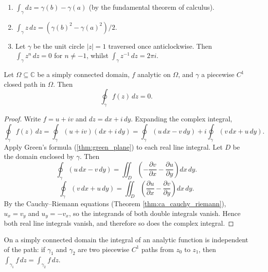 \begin{example}\label{ex:ca_basic_integrals}
\begin{enumerate}[label=(\roman*)]
    \item $\int_\gamma dz = \gamma(b) - \gamma(a)$ (by the fundamental theorem of calculus).
    \item $\int_\gamma z \, dz = (\gamma(b)^2 - \gamma(a)^2)/2$.
    \item Let $\gamma$ be the unit circle $|z| = 1$ traversed once anticlockwise. Then $\int_\gamma z^n \, dz = 0$ for $n \neq -1$, whilst $\int_\gamma z^{-1} \, dz = 2\pi i$.
\end{enumerate}
\end{example}

\begin{theorem}\label{thm:ca_cauchy_integral}
Let $\Omega \subseteq \mathbb{C}$ be a simply connected domain, $f$ analytic on $\Omega$, and $\gamma$ a piecewise $C^1$ closed path in $\Omega$. Then
\[
\oint_\gamma f(z) \, dz = 0.
\]
\end{theorem}

\begin{proof}
Write $f = u + iv$ and $dz = dx + i \, dy$. Expanding the complex integral,
\[
\oint_\gamma f(z) \, dz = \oint_\gamma (u + iv)(dx + i \, dy) = \oint_\gamma (u \, dx - v \, dy) + i \oint_\gamma (v \, dx + u \, dy).
\]
Apply Green's formula (\cref{thm:green_plane}) to each real line integral. Let $D$ be the domain enclosed by $\gamma$. Then
\[
\oint_\gamma (u \, dx - v \, dy) = \iint_D \left( -\frac{\partial v}{\partial x} - \frac{\partial u}{\partial y} \right) dx \, dy.
\]
\[
\oint_\gamma (v \, dx + u \, dy) = \iint_D \left( \frac{\partial u}{\partial x} - \frac{\partial v}{\partial y} \right) dx \, dy.
\]
By the Cauchy--Riemann equations (Theorem \ref{thm:ca_cauchy_riemann}), $u_x = v_y$ and $u_y = -v_x$, so the integrands of both double integrals vanish. Hence both real line integrals vanish, and therefore so does the complex integral.
\end{proof}

\begin{corollary}\label{cor:ca_cauchy_integral_equivalent}
On a simply connected domain the integral of an analytic function is independent of the path: if $\gamma_1$ and $\gamma_2$ are two piecewise $C^1$ paths from $z_0$ to $z_1$, then $\int_{\gamma_1} f \, dz = \int_{\gamma_2} f \, dz$.
\end{corollary}

